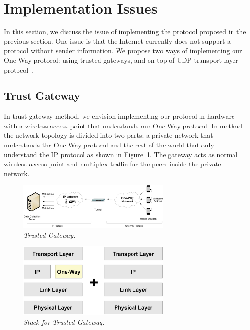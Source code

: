 \section{Implementation Issues}\label{sec-imp}

In this section, we discuss the issue of implementing the protocol proposed
in the previous section. One issue is that the Internet currently does not
support a protocol without sender information. We propose two ways of
implementing our One-Way protocol: using trusted gateways, and on top of
UDP transport layer protocol~\cite{RFC768}.

\subsection{Trust Gateway}

In trust gateway method, we envision implementing our protocol in hardware
with a wireless access point that understands our One-Way protocol.
In method the network topology is divided into two parts: a private
network that understands the One-Way protocol and the rest of the world that
only understand the IP protocol as shown in Figure~\ref{fig:gateway}. The
gateway acts as normal wireless access point and multiplex traffic for the
peers inside the private network.

\begin{figure}[h]
\begin{center}
\includegraphics[width=3in]{figure2.eps}
\caption{\small \sl Trusted Gateway.\label{fig:gateway}}
\end{center}
\end{figure}

\begin{figure}[h]
\begin{center}
\includegraphics[width=3in]{figure2b.eps}
\caption{\small \sl Stack for Trusted Gateway.\label{fig:gateway_b}}
\end{center}
\end{figure}

